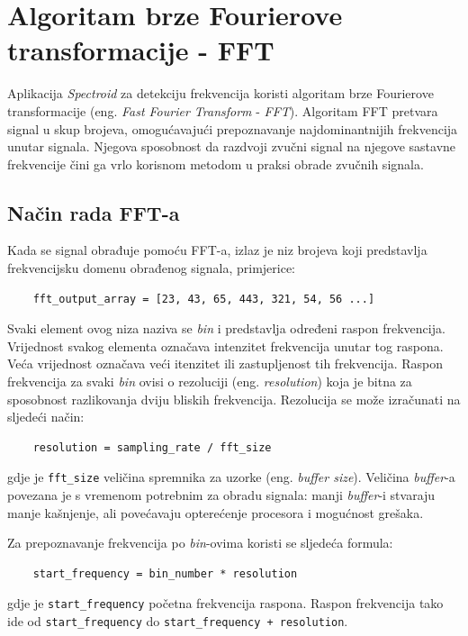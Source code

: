 \documentclass[times, utf8, diplomski, numeric]{fer}
\begin{document}
\chapter{Algoritam brze Fourierove transformacije - FFT}
Aplikacija \textit{Spectroid} za detekciju frekvencija koristi algoritam brze Fourierove transformacije (eng. \textit{Fast Fourier Transform} - \textit{FFT}).\cite{reinke_2018} Algoritam FFT pretvara signal u skup brojeva, omogućavajući prepoznavanje najdominantnijih frekvencija unutar signala. Njegova sposobnost da razdvoji zvučni signal na njegove sastavne frekvencije čini ga vrlo korisnom metodom u praksi obrade zvučnih signala.\cite{gustine_2021}

\section{Način rada FFT-a}
Kada se signal obrađuje pomoću FFT-a, izlaz je niz brojeva koji predstavlja frekvencijsku domenu obrađenog signala, primjerice:
\begin{verbatim}
	fft_output_array = [23, 43, 65, 443, 321, 54, 56 ...]
\end{verbatim}
Svaki element ovog niza naziva se \textit{bin} i predstavlja određeni raspon frekvencija. Vrijednost svakog elementa označava intenzitet frekvencija unutar tog raspona. Veća vrijednost označava veći itenzitet ili zastupljenost tih frekvencija. Raspon frekvencija za svaki \textit{bin} ovisi o rezoluciji (eng. \textit{resolution}) koja je bitna za sposobnost razlikovanja dviju bliskih frekvencija. Rezolucija se može izračunati na sljedeći način:
\begin{verbatim}
	resolution = sampling_rate / fft_size
\end{verbatim}
gdje je \verb|fft_size| veličina spremnika za uzorke (eng. \textit{buffer size}).\cite{lourde2009digital} Veličina \textit{buffer}-a povezana je s vremenom potrebnim za obradu signala: manji \textit{buffer}-i stvaraju manje kašnjenje, ali povećavaju opterećenje procesora i mogućnost grešaka.\cite{focusrite_2022}

Za prepoznavanje frekvencija po \textit{bin}-ovima koristi se sljedeća formula:
\begin{verbatim}
	start_frequency = bin_number * resolution
\end{verbatim}
gdje je \verb|start_frequency| početna frekvencija raspona.\cite{gustine_2021} Raspon frekvencija tako ide od \verb|start_frequency| do \verb|start_frequency + resolution|.
\end{document}
